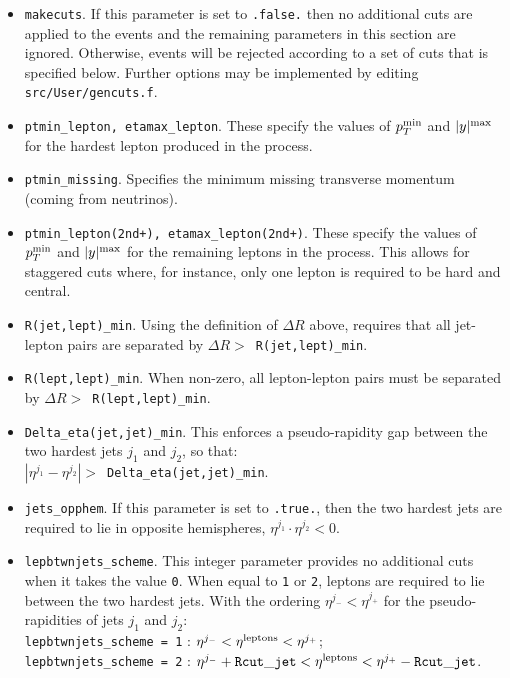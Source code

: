 \documentclass[12pt]{article}
\begin{document}
\begin{itemize}
\item {\tt makecuts}. If this parameter is set to {\tt .false.} then
no additional cuts are applied to the events and the remaining
parameters in this section are ignored. Otherwise, events will
be rejected according to a set of cuts that is specified below.
Further options may be implemented by editing {\tt src/User/gencuts.f}.

\item {\tt ptmin\_lepton, etamax\_lepton}. These specify the values
of $p_T^{\rm min}$ and $|y|^{\rm max}$ for the hardest lepton produced
in the process.
\item {\tt ptmin\_missing}. Specifies the minimum missing transverse
momentum (coming from neutrinos).
\item {\tt ptmin\_lepton(2nd+), etamax\_lepton(2nd+)}. These specify
the values of $p_T^{\rm min}$ and $|y|^{\rm max}$ for the remaining
leptons in the process. This allows for staggered cuts where, for
instance, only one lepton is required to be hard and central.

\item {\tt R(jet,lept)\_min}. Using the definition of $\Delta R$ above,
requires that all jet-lepton pairs are separated by
$\Delta R >$~{\tt R(jet,lept)\_min}.

\item {\tt R(lept,lept)\_min}. When non-zero, all lepton-lepton pairs
must be separated by $\Delta R >$~{\tt R(lept,lept)\_min}.

\item {\tt Delta\_eta(jet,jet)\_min}. This enforces a pseudo-rapidity
gap between the two hardest jets $j_1$ and $j_2$, so that: \\
$|\eta^{j_1} - \eta^{j_2}| >$~{\tt Delta\_eta(jet,jet)\_min}.

\item {\tt jets\_opphem}. If this parameter is set to {\tt .true.},
then the two hardest jets are required to lie in opposite hemispheres,
$\eta^{j_1} \cdot \eta^{j_2} < 0$.

\item {\tt lepbtwnjets\_scheme}. This integer parameter provides no
additional cuts when it takes the value {\tt 0}. When equal to
{\tt 1} or {\tt 2}, leptons are required to lie between the two
hardest jets. With the ordering $\eta^{j_-} < \eta^{j_+}$ for the
pseudo-rapidities of jets $j_1$ and $j_2$: \\
{\tt lepbtwnjets\_scheme = 1} : 
 $\eta^{j_-} < \eta^{\rm leptons} < \eta^{j_+}$; \\
{\tt lepbtwnjets\_scheme = 2} :
 $\eta^{j_-}+{\tt Rcut\_jet} < \eta^{\rm leptons} < \eta^{j_+}-{\tt Rcut\_jet}$.


\end{itemize}
\end{document}
